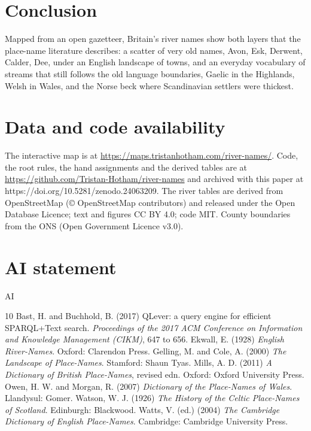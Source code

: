 \documentclass[11pt,a4paper]{article}
\begin{document}
\section{Conclusion}
Mapped from an open gazetteer, Britain's river names show both layers that the place-name literature describes: a scatter of very old names, Avon, Esk, Derwent, Calder, Dee, under an English landscape of towns, and an everyday vocabulary of streams that still follows the old language boundaries, Gaelic in the Highlands, Welsh in Wales, and the Norse beck where Scandinavian settlers were thickest.

\section*{Data and code availability}
The interactive map is at \url{https://maps.tristanhotham.com/river-names/}. Code, the root rules, the hand assignments and the derived tables are at \url{https://github.com/Tristan-Hotham/river-names} and archived with this paper at https://doi.org/10.5281/zenodo.24063209. The river tables are derived from OpenStreetMap (\copyright{} OpenStreetMap contributors) and released under the Open Database Licence; text and figures CC BY 4.0; code MIT. County boundaries from the ONS (Open Government Licence v3.0).

\section*{AI statement}
{{AI}}

\begin{thebibliography}{10}
 Bast, H. and Buchhold, B. (2017) QLever: a query engine for efficient SPARQL+Text search. \textit{Proceedings of the 2017 ACM Conference on Information and Knowledge Management (CIKM)}, 647 to 656.
 Ekwall, E. (1928) \textit{English River-Names}. Oxford: Clarendon Press.
 Gelling, M. and Cole, A. (2000) \textit{The Landscape of Place-Names}. Stamford: Shaun Tyas.
 Mills, A. D. (2011) \textit{A Dictionary of British Place-Names}, revised edn. Oxford: Oxford University Press.
 Owen, H. W. and Morgan, R. (2007) \textit{Dictionary of the Place-Names of Wales}. Llandysul: Gomer.
 Watson, W. J. (1926) \textit{The History of the Celtic Place-Names of Scotland}. Edinburgh: Blackwood.
 Watts, V. (ed.) (2004) \textit{The Cambridge Dictionary of English Place-Names}. Cambridge: Cambridge University Press.
\end{thebibliography}
\end{document}
